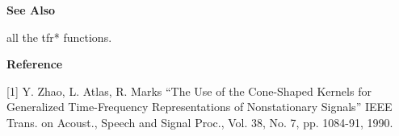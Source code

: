 {\bf \large \sf See Also}\\
\hspace*{1.5cm}
\begin{minipage}[t]{13.5cm}
all the {\ty tfr*} functions.
\end{minipage}
\vspace*{.5cm}


{\bf \large \sf Reference}\\
\hspace*{1.5cm}
\begin{minipage}[t]{13.5cm}
[1] Y. Zhao, L. Atlas, R. Marks ``The Use of the Cone-Shaped Kernels for
Generalized Time-Frequency Representations of Nonstationary Signals'' IEEE
Trans. on Acoust., Speech and Signal Proc., Vol. 38, No. 7, pp. 1084-91,
1990. 
\end{minipage}

